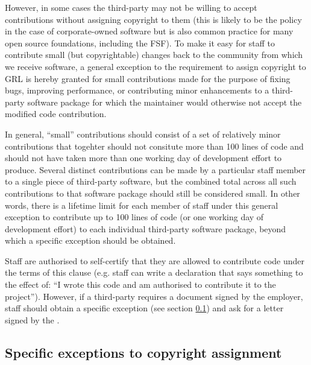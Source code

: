\documentclass[10pt,a4paper]{article}
\begin{document}
\begin{itemize}
\par However, in some cases the third-party may not be willing to accept contributions 
without assigning copyright to them (this is likely to be the policy in the case of 
corporate-owned software but is also common practice for many open source 
foundations, including the FSF). To make it easy for staff to contribute small 
(but copyrightable) changes back to the community from which we receive 
software, a general exception to the requirement to assign copyright to GRL is 
hereby granted for small contributions made for the purpose of fixing bugs, 
improving performance, or contributing minor enhancements to a third-party 
software package for which the maintainer would otherwise not accept the 
modified code contribution. 

\par In general, ``small'' contributions should consist of a set of relatively minor 
contributions that togehter should not consitute more than 100 lines of code 
and should not have taken more than one working day of development effort 
to produce. Several distinct contributions can be made by a particular staff 
member to a single piece of third-party software, but the combined total across 
all such contributions to that software package should still be considered small. 
In other words, there is a lifetime limit for each member of staff under this general 
exception to contribute up to 100 lines of code (or one working day of 
development effort) to each individual third-party software package, beyond 
which a specific exception should be obtained. 

\par Staff are authorised to self-certify that they are allowed to contribute code 
under the terms of this clause (e.g. staff can write a declaration that says 
something to the effect of: ``I wrote this code and am authorised to contribute 
it to the project''). However, if a third-party requires a document signed 
by the employer, staff should obtain a specific exception (see 
section \ref{section:exceptions.special}) and ask for a letter signed by the \exectitle.

\end{itemize}


\subsection{Specific exceptions to copyright assignment}
\label{section:exceptions.special}
\end{document}
